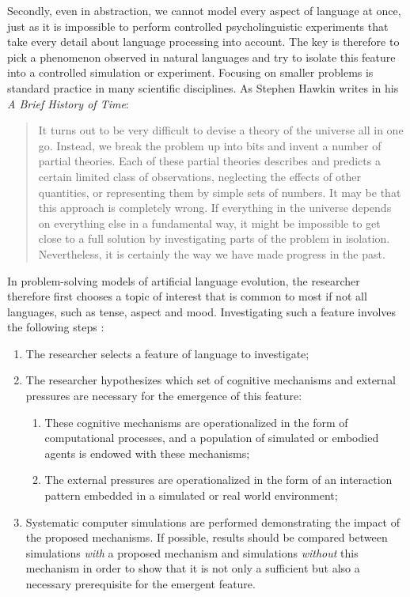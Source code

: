 Secondly, even in abstraction, we cannot model every aspect of language at once, just as it is impossible to perform controlled psycholinguistic experiments that take every detail about language processing into account. The key is therefore to pick a phenomenon observed in natural languages and try to isolate this feature into a controlled simulation or experiment. Focusing on smaller problems is standard practice in many scientific disciplines. As Stephen Hawkin writes in his {\em A Brief History of Time}:

\begin{quote}
It turns out to be very difficult to devise a theory of the universe all in one go. Instead, we break the problem up into bits and invent a number of partial theories. Each of these partial theories describes and predicts a certain limited class of observations, neglecting the effects of other quantities, or representing them by simple sets of numbers. It may be that this approach is completely wrong. If everything in the universe depends on everything else in a fundamental way, it might be impossible to get close to a full solution by investigating parts of the problem in isolation. Nevertheless, it is certainly the way we have made progress in the past. 
\\ \cite[12]{hawkin88brief}
\end{quote}

In problem-solving models of artificial language evolution, the researcher therefore first chooses a topic of interest that is common to most if not all languages, such as tense, aspect and mood. Investigating such a feature involves the following steps \citep{steels06how}:


\begin{enumerate}
\item The researcher selects a feature of language to investigate;
\item The researcher hypothesizes which set of cognitive mechanisms and external pressures are necessary for the emergence of this feature:
\begin{enumerate}
\item These cognitive mechanisms are operationalized in the form of computational processes, and a population of simulated or embodied agents is endowed with these mechanisms;
\item The external pressures are operationalized in the form of an interaction pattern embedded in a simulated or real world environment;
\end{enumerate}
\item Systematic computer simulations are performed demonstrating the impact of the proposed mechanisms. If possible, results should be compared between simulations {\em with} a proposed mechanism and simulations {\em without} this mechanism in order to show that it is not only a sufficient but also a necessary prerequisite for the emergent feature. 
\end{enumerate}

